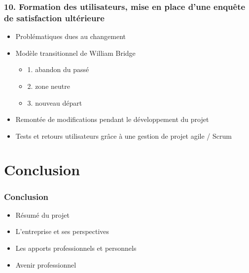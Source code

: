 \documentclass[aspectratio=169]{beamer}
\begin{document}
\begin{frame}
  \frametitle{10. Formation des utilisateurs, mise en place d’une enquête de satisfaction ultérieure}
  \begin{itemize}
    \item Problématiques dues au changement
    \item Modèle transitionnel de William Bridge
      \begin{itemize}
        \item 1. abandon du passé
        \item 2. zone neutre
        \item 3. nouveau départ 
      \end{itemize}
    \item Remontée de modifications pendant le développement du projet
    \item Tests et retours utilisateurs grâce à une gestion de projet agile / Scrum
  \end{itemize}
\end{frame}

\section{Conclusion}

\begin{frame}
  \frametitle{Conclusion}
  \begin{itemize}
    \item Résumé du projet
    \item L'entreprise et ses perspectives
    \item Les apports professionnels et personnels
    \item Avenir professionnel
  \end{itemize}
\end{frame}
\end{document}
